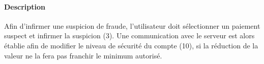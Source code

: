 \paragraph{Description} Afin d'infirmer une suspicion de fraude, l'utilisateur doit sélectionner un paiement suspect et infirmer la suspicion (3). Une communication avec le serveur est alors établie afin de modifier le niveau de sécurité du compte (10), si la réduction de la valeur ne la fera pas franchir le minimum autorisé.